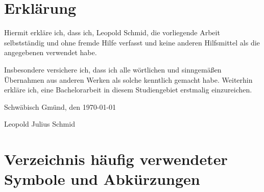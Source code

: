 \documentclass[12pt, a4paper]{article}
\begin{document}
%        
%        
%        
%        
%        
%        
%        
%        
%        
%        


\newpage

\section*{Erklärung}

Hiermit erkläre ich, dass ich, Leopold Schmid, die vorliegende Arbeit selbstständig und ohne fremde Hilfe verfasst und keine anderen Hilfsmittel als die angegebenen verwendet habe.

Insbesondere versichere ich, dass ich alle wörtlichen und sinngemäßen Übernahmen aus anderen Werken als solche kenntlich gemacht habe. Weiterhin erkläre ich, eine Bachelorarbeit in diesem Studiengebiet erstmalig einzureichen. \\
\vspace{2\baselineskip}
  
Schwäbisch Gmünd, den \today 

\vspace{2\baselineskip}

\parbox{0.6\linewidth}{\dotfill}

\vspace{0.5\baselineskip}

Leopold Julius Schmid


\newpage


\section*{Verzeichnis häufig verwendeter Symbole und Abkürzungen}
\end{document}
